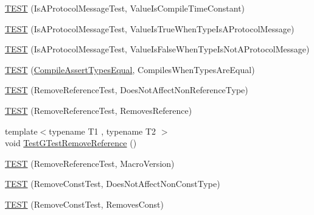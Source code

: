 \begin{DoxyCompactItemize}
\item 
\mbox{\hyperlink{_obj__test_2lib_2googletest-master_2googletest_2test_2gtest__unittest_8cc_a92eccf2c14f70b39d88564370690b303}{T\+E\+ST}} (Is\+A\+Protocol\+Message\+Test, Value\+Is\+Compile\+Time\+Constant)
\item 
\mbox{\hyperlink{_obj__test_2lib_2googletest-master_2googletest_2test_2gtest__unittest_8cc_ac9103349aa0cc06b769d69f0e8106997}{T\+E\+ST}} (Is\+A\+Protocol\+Message\+Test, Value\+Is\+True\+When\+Type\+Is\+A\+Protocol\+Message)
\item 
\mbox{\hyperlink{_obj__test_2lib_2googletest-master_2googletest_2test_2gtest__unittest_8cc_a5f72b1b55ea8c769dc1c6c182f4d9be2}{T\+E\+ST}} (Is\+A\+Protocol\+Message\+Test, Value\+Is\+False\+When\+Type\+Is\+Not\+A\+Protocol\+Message)
\item 
\mbox{\hyperlink{_obj__test_2lib_2googletest-master_2googletest_2test_2gtest__unittest_8cc_aae9a7c282222598d5d254cf470c9a45b}{T\+E\+ST}} (\mbox{\hyperlink{structtesting_1_1internal_1_1_compile_assert_types_equal}{Compile\+Assert\+Types\+Equal}}, Compiles\+When\+Types\+Are\+Equal)
\item 
\mbox{\hyperlink{_obj__test_2lib_2googletest-master_2googletest_2test_2gtest__unittest_8cc_a3a7ab4954eeaf0889269b56ca3df558e}{T\+E\+ST}} (Remove\+Reference\+Test, Does\+Not\+Affect\+Non\+Reference\+Type)
\item 
\mbox{\hyperlink{_obj__test_2lib_2googletest-master_2googletest_2test_2gtest__unittest_8cc_ae15336b18be29c1317624a2ffdb74530}{T\+E\+ST}} (Remove\+Reference\+Test, Removes\+Reference)
\item 
{\footnotesize template$<$typename T1 , typename T2 $>$ }\\void \mbox{\hyperlink{_obj__test_2lib_2googletest-master_2googletest_2test_2gtest__unittest_8cc_adb1f904a1a5761796ac803fdf4f203a5}{Test\+G\+Test\+Remove\+Reference}} ()
\item 
\mbox{\hyperlink{_obj__test_2lib_2googletest-master_2googletest_2test_2gtest__unittest_8cc_a742fff74857242801058ef6d192b1910}{T\+E\+ST}} (Remove\+Reference\+Test, Macro\+Version)
\item 
\mbox{\hyperlink{_obj__test_2lib_2googletest-master_2googletest_2test_2gtest__unittest_8cc_a553d6725457e4b4e9d89d60f0cc58470}{T\+E\+ST}} (Remove\+Const\+Test, Does\+Not\+Affect\+Non\+Const\+Type)
\item 
\mbox{\hyperlink{_obj__test_2lib_2googletest-master_2googletest_2test_2gtest__unittest_8cc_aa9be3d92628cb49887909ae2c75a231b}{T\+E\+ST}} (Remove\+Const\+Test, Removes\+Const)

\end{DoxyCompactItemize}
